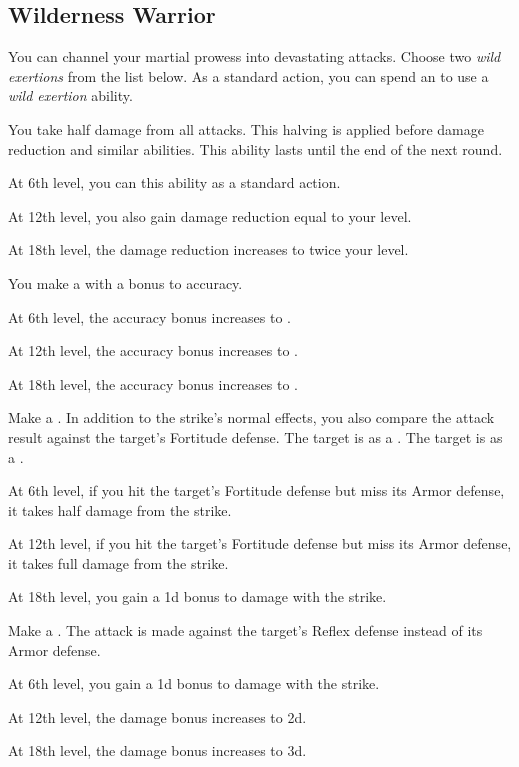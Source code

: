     \subsection{Wilderness Warrior}
        You can channel your martial prowess into devastating attacks.
        Choose two \textit{wild exertions} from the list below.
        As a standard action, you can spend an  to use a \textit{wild exertion} ability.
        {
             You take half damage from all attacks.
            This halving is applied before damage reduction and similar abilities.
            This ability lasts until the end of the next round.
            \par At 6th level, you can  this ability as a standard action.
            \par At 12th level, you also gain damage reduction equal to your level.
            \par At 18th level, the damage reduction increases to twice your level.

             You make a  with a  bonus to accuracy.
            \par At 6th level, the accuracy bonus increases to .
            \par At 12th level, the accuracy bonus increases to .
            \par At 18th level, the accuracy bonus increases to .

             Make a .
            In addition to the strike's normal effects, you also compare the attack result against the target's Fortitude defense.
             The target is \sickened as a .
             The target is \nauseated as a .
            \par At 6th level, if you hit the target's Fortitude defense but miss its Armor defense, it takes half damage from the strike.
            \par At 12th level, if you hit the target's Fortitude defense but miss its Armor defense, it takes full damage from the strike.
            \par At 18th level, you gain a \plus1d bonus to damage with the strike.

             Make a .
            The attack is made against the target's Reflex defense instead of its Armor defense.
            \par At 6th level, you gain a \plus1d bonus to damage with the strike.
            \par At 12th level, the damage bonus increases to \plus2d.
            \par At 18th level, the damage bonus increases to \plus3d.

}
